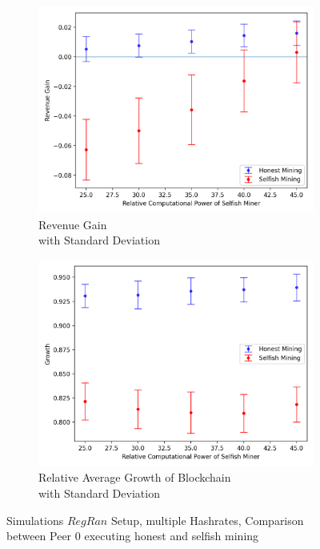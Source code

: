 \begin{figure}[tbp]
	 \begin{subfigure}[b]{0.5\textwidth}
		\includegraphics[width=\textwidth]{figures/rev_and_bpr_per_peer.png}
		\caption{Revenue Gain\\ with Standard Deviation}
		\label{fig:multi_hr}
	\end{subfigure}
	\hfill
	\begin{subfigure}[b]{0.5\textwidth}
		\includegraphics[width=\textwidth]{figures/growth.png}
		\caption{Relative Average Growth of Blockchain \\with Standard Deviation}
		\label{fig:multi_hr_growth}
	\end{subfigure}
	\caption{Simulations $RegRan$ Setup, multiple Hashrates, Comparison between Peer $0$ executing honest and selfish mining}
	\label{fig:mhr}
\end{figure}
